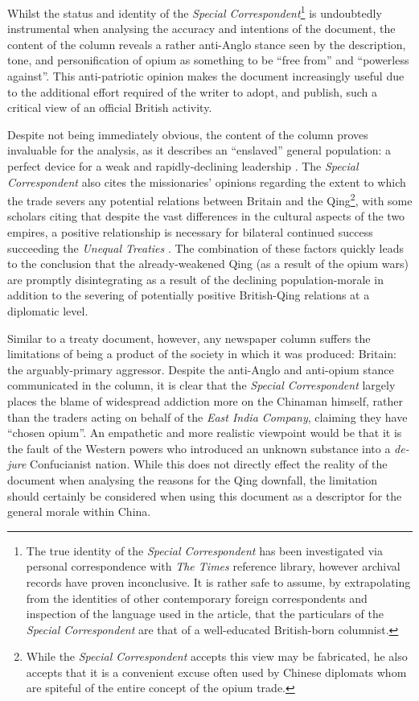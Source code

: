 \documentclass{article}
\begin{document}
Whilst the status and identity of the \textit{Special Correspondent}\footnote{The true identity of the \textit{Special Correspondent} has been investigated via personal correspondence with \textit{The Times} reference library, however archival records have proven inconclusive. It is rather safe to assume, by extrapolating from the identities of other contemporary foreign correspondents and inspection of the language used in the article, that the particulars of the \textit{Special Correspondent} are that of a well-educated British-born columnist.} is undoubtedly instrumental when analysing the accuracy and intentions of the document, the content of the column reveals a rather anti-Anglo stance seen by the description, tone, and personification of opium as something to be ``free from'' and ``powerless against''. This anti-patriotic opinion makes the document increasingly useful due to the additional effort required of the writer to adopt, and publish, such a critical view of an official British activity.

Despite not being immediately obvious, the content of the column proves invaluable for the analysis, as it describes an ``enslaved'' general population: a perfect device for a weak and rapidly-declining leadership
\autocite{Rotberg:2003}. The \textit{Special Correspondent} also cites the missionaries' opinions regarding the extent to which the trade severs any potential relations between Britain and the Qing\footnote{While the \textit{Special Correspondent} accepts this view may be fabricated, he also accepts that it is a convenient excuse often used by Chinese diplomats whom are spiteful of the entire concept of the opium trade.}, with some scholars citing that despite the vast differences in the cultural aspects of the two empires, a positive relationship is necessary for bilateral continued success succeeding the \textit{Unequal Treaties}
\autocite{Fairbank:1942}. The combination of these factors quickly leads to the conclusion that the already-weakened Qing (as a result of the opium wars) are promptly disintegrating as a result of the declining population-morale in addition to the severing of potentially positive British-Qing relations at a diplomatic level.

Similar to a treaty document, however, any newspaper column suffers the limitations of being a product of the society in which it was produced: Britain: the arguably-primary aggressor. Despite the anti-Anglo and anti-opium stance communicated in the column, it is clear that the \textit{Special Correspondent} largely places the blame of widespread addiction more on the Chinaman himself, rather than the traders acting on behalf of the \textit{East India Company}, claiming they have ``chosen opium''. An empathetic and more realistic viewpoint would be that it is the fault of the Western powers who introduced an unknown substance into a \textit{de-jure} Confucianist
\autocite{Billioud:2007} nation. While this does not directly effect the reality of the document when analysing the reasons for the Qing downfall, the limitation should certainly be considered when using this document as a descriptor for the general morale within China.
\end{document}
